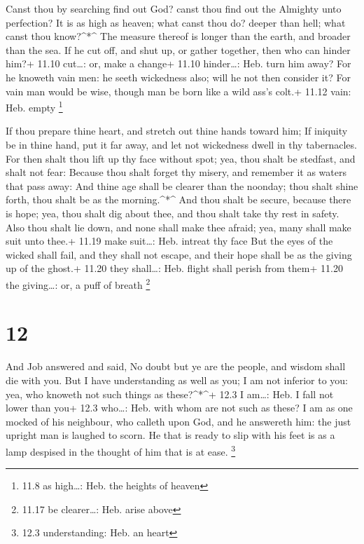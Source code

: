  Canst thou by searching find out God? canst thou find out
the Almighty unto perfection?  It is as high as heaven; what
canst thou do? deeper than hell; what canst thou know?\^{}*\^{}
 The measure thereof is longer than the earth, and broader
than the sea.  If he cut off, and shut up, or gather
together, then who can hinder him?+ 11.10 cut\ldots: or, make a change+
11.10 hinder\ldots: Heb. turn him away?  For he knoweth
vain men: he seeth wickedness also; will he not then consider it?
 For vain man would be wise, though man be born like a wild
ass's colt.+ 11.12 vain: Heb. empty \footnote{11.8 as high\ldots: Heb.
  the heights of heaven}

 If thou prepare thine heart, and stretch out thine hands
toward him;  If iniquity be in thine hand, put it far away,
and let not wickedness dwell in thy tabernacles.  For then
shalt thou lift up thy face without spot; yea, thou shalt be stedfast,
and shalt not fear:  Because thou shalt forget thy misery,
and remember it as waters that pass away:  And thine age
shall be clearer than the noonday; thou shalt shine forth, thou shalt be
as the morning.\^{}*\^{}  And thou shalt be secure, because
there is hope; yea, thou shalt dig about thee, and thou shalt take thy
rest in safety.  Also thou shalt lie down, and none shall
make thee afraid; yea, many shall make suit unto thee.+ 11.19 make
suit\ldots: Heb. intreat thy face  But the eyes of the
wicked shall fail, and they shall not escape, and their hope shall be as
the giving up of the ghost.+ 11.20 they shall\ldots: Heb. flight shall
perish from them+ 11.20 the giving\ldots: or, a puff of breath
\footnote{11.17 be clearer\ldots: Heb. arise above}

\hypertarget{section-11}{%
\section{12}\label{section-11}}

 And Job answered and said,  No doubt but ye are
the people, and wisdom shall die with you.  But I have
understanding as well as you; I am not inferior to you: yea, who knoweth
not such things as these?\^{}*\^{}+ 12.3 I am\ldots: Heb. I fall not
lower than you+ 12.3 who\ldots: Heb. with whom are not such as these?
 I am as one mocked of his neighbour, who calleth upon God,
and he answereth him: the just upright man is laughed to scorn.
 He that is ready to slip with his feet is as a lamp
despised in the thought of him that is at ease. \footnote{12.3
  understanding: Heb. an heart}

